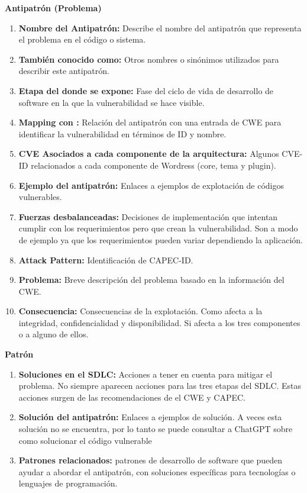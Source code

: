 
\textbf{Antipatrón (Problema)}

    \begin{enumerate}
        \item \textbf{Nombre del Antipatrón:} Describe el nombre del antipatrón que representa el problema en el código o sistema.
        \item \textbf{También conocido como:} Otros nombres o sinónimos utilizados para describir este antipatrón.
        \item \textbf{Etapa del  donde se expone:} Fase del ciclo de vida de desarrollo de software en la que la vulnerabilidad se hace visible. 
        \item \textbf{Mapping con :} Relación del antipatrón con una entrada de CWE para identificar la vulnerabilidad en términos de ID y nombre.
        \item \textbf{CVE Asociados a cada componente de la arquitectura:} Algunos CVE-ID relacionados a cada componente de Wordress (core, tema y plugin).
        \item \textbf{Ejemplo del antipatrón:} Enlaces a ejemplos de explotación de códigos vulnerables. 
        \item \textbf{Fuerzas desbalanceadas:} Decisiones de implementación que intentan cumplir con los requerimientos pero que crean la vulnerabilidad. Son a modo de ejemplo ya que los requerimientos pueden variar dependiendo la aplicación.
        \item \textbf{Attack Pattern:} Identificación de CAPEC-ID.
        \item \textbf{Problema:} Breve descripción del problema basado en la información del CWE.
        \item \textbf{Consecuencia:} Consecuencias de la explotación. Como afecta a la integridad, confidencialidad y disponibilidad. Si afecta a los tres componentes o a alguno de ellos.
    \end{enumerate}

\textbf{Patrón}

    \begin{enumerate}
        \item \textbf{Soluciones en el SDLC:}  Acciones a tener en cuenta para mitigar el problema. No siempre aparecen acciones para las tres etapas del SDLC. Estas acciones surgen de las recomendaciones de el CWE y CAPEC.
        \item \textbf{Solución del antipatrón:} Enlaces a ejemplos de solución. A veces esta solución no se encuentra, por lo tanto se puede consultar a ChatGPT sobre como solucionar el código vulnerable
        \item \textbf{Patrones relacionados:} patrones de desarrollo de software que pueden ayudar a abordar el antipatrón, con soluciones específicas para tecnologías o lenguajes de programación.
    \end{enumerate}